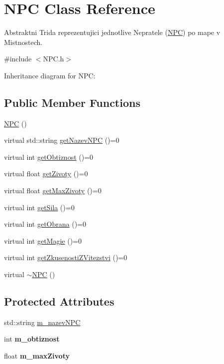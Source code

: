 \hypertarget{class_n_p_c}{\section{N\-P\-C Class Reference}
\label{class_n_p_c}
}


Abstraktni Trida reprezentujici jednotlive Nepratele (\hyperlink{class_n_p_c}{N\-P\-C}) po mape v Mistnostech.  




{\ttfamily \#include $<$N\-P\-C.\-h$>$}



Inheritance diagram for N\-P\-C\-:
\subsection*{Public Member Functions}
\begin{DoxyCompactItemize}
\item 
\hyperlink{class_n_p_c_a59b45912692304d555df9d6957046962}{N\-P\-C} ()
\item 
virtual std\-::string \hyperlink{class_n_p_c_aae64f14a7a2e4f56ca574513babc41e8}{get\-Nazev\-N\-P\-C} ()=0
\item 
virtual int \hyperlink{class_n_p_c_ad396ca543207b0535312b8f5e1e52d10}{get\-Obtiznost} ()=0
\item 
virtual float \hyperlink{class_n_p_c_a89a49559c82edfde6ea567c51cc8fff3}{get\-Zivoty} ()=0
\item 
virtual float \hyperlink{class_n_p_c_af703dfd16eb06c832941afd1c3651b27}{get\-Max\-Zivoty} ()=0
\item 
virtual int \hyperlink{class_n_p_c_af86f56452f73db42d39de9bbd6c7e1e0}{get\-Sila} ()=0
\item 
virtual int \hyperlink{class_n_p_c_ae9234bcd90e10d872643a5b542ea4ad9}{get\-Obrana} ()=0
\item 
virtual int \hyperlink{class_n_p_c_a1379d09aacf9a3db8f0b92eeb811f4cf}{get\-Magie} ()=0
\item 
virtual int \hyperlink{class_n_p_c_a3987735754198ab346e6dc09a5d24bbf}{get\-Zkusenosti\-Z\-Vitezstvi} ()=0
\item 
virtual \hyperlink{class_n_p_c_a67c0caca129b56c82bb7ec8bce6be52b}{$\sim$\-N\-P\-C} ()
\end{DoxyCompactItemize}
\subsection*{Protected Attributes}
\begin{DoxyCompactItemize}
\item 
std\-::string \hyperlink{class_n_p_c_a088d47b313f2eb585069575996e7d746}{m\-\_\-nazev\-N\-P\-C}
\item 
\hypertarget{class_n_p_c_a80cafef48f198523d2640d1485fda11b}{int {\bfseries m\-\_\-obtiznost}}\label{class_n_p_c_a80cafef48f198523d2640d1485fda11b}

\item 
\hypertarget{class_n_p_c_a77791315f8bf036da95a1fc6fd434461}{float {\bfseries m\-\_\-max\-Zivoty}}\label{class_n_p_c_a77791315f8bf036da95a1fc6fd434461}

\end{DoxyCompactItemize}



